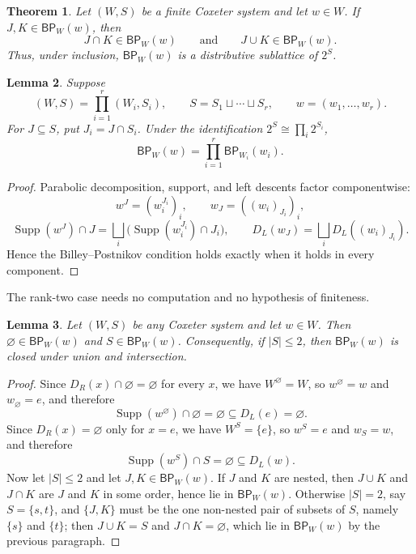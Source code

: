 \documentclass[11pt]{amsart}
\newtheorem{theorem}{Theorem}
\newtheorem{lemma}[theorem]{Lemma}
\DeclareMathOperator{\Supp}{Supp}
\newcommand{\BP}{\mathsf{BP}}
\newcommand{\DL}{D_L}
\newcommand{\DR}{D_R}
\begin{document}
\begin{theorem}\label{thm:main}
Let $(W,S)$ be a finite Coxeter system and let $w\in W$. If
$J,K\in\BP_W(w)$, then
\[
  J\cap K\in\BP_W(w)
  \qquad\text{and}\qquad
  J\cup K\in\BP_W(w).
\]
Thus, under inclusion, $\BP_W(w)$ is a distributive sublattice of $2^S$.
\end{theorem}

\begin{lemma}\label{lem:product}
Suppose
\[
  (W,S)=\prod_{i=1}^r (W_i,S_i),
  \qquad
  S=S_1\sqcup\cdots\sqcup S_r,
  \qquad
  w=(w_1,\ldots,w_r).
\]
For $J\subseteq S$, put $J_i=J\cap S_i$. Under the identification
$2^S\cong\prod_i2^{S_i}$,
\[
  \BP_W(w)=\prod_{i=1}^r \BP_{W_i}(w_i).
\]
\end{lemma}

\begin{proof}
Parabolic decomposition, support, and left descents factor componentwise:
\[
  w^J=(w_i^{J_i})_i,
  \qquad
  w_J=((w_i)_{J_i})_i,
\]
\[
  \Supp(w^J)\cap J
  =\bigsqcup_i\bigl(\Supp(w_i^{J_i})\cap J_i\bigr),
  \qquad
  \DL(w_J)=\bigsqcup_i\DL((w_i)_{J_i}).
\]
Hence the Billey--Postnikov condition holds exactly when it holds in every
component.
\end{proof}

The rank-two case needs no computation and no hypothesis of finiteness.

\begin{lemma}\label{lem:rank2}
Let $(W,S)$ be any Coxeter system and let $w\in W$. Then
$\varnothing\in\BP_W(w)$ and $S\in\BP_W(w)$. Consequently, if $|S|\leq2$,
then $\BP_W(w)$ is closed under union and intersection.
\end{lemma}

\begin{proof}
Since $\DR(x)\cap\varnothing=\varnothing$ for every $x$, we have
$W^{\varnothing}=W$, so $w^{\varnothing}=w$ and $w_{\varnothing}=e$, and
therefore
\[
  \Supp(w^{\varnothing})\cap\varnothing
  =\varnothing
  \subseteq\DL(e)=\varnothing .
\]
Since $\DR(x)=\varnothing$ only for $x=e$, we have $W^S=\{e\}$, so $w^S=e$
and $w_S=w$, and therefore
\[
  \Supp(w^S)\cap S=\varnothing\subseteq\DL(w).
\]
Now let $|S|\leq2$ and let $J,K\in\BP_W(w)$. If $J$ and $K$ are nested,
then $J\cup K$ and $J\cap K$ are $J$ and $K$ in some order, hence lie in
$\BP_W(w)$. Otherwise $|S|=2$, say $S=\{s,t\}$, and $\{J,K\}$ must be the
one non-nested pair of subsets of $S$, namely $\{s\}$ and $\{t\}$; then
$J\cup K=S$ and $J\cap K=\varnothing$, which lie in $\BP_W(w)$ by the
previous paragraph.
\end{proof}
\end{document}
